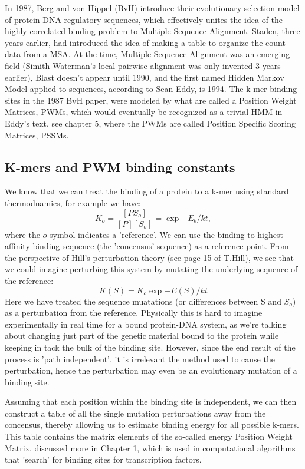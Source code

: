 In 1987, Berg and von-Hippel (BvH) introduce their evolutionary selection model of protein DNA regulatory sequences, which effectively unites the idea of the highly correlated binding problem to Multiple Sequence Alignment.  Staden, three years earlier, had introduced the idea of making a table to organize the count data from a MSA.  At the time, Multiple Sequence Alignment was an emerging field (Simith Waterman's local pairwise alignment was only invented 3 years earlier), Blast doesn't appear until 1990, and the first named Hidden Markov Model applied to sequences, according to Sean Eddy, is 1994.  The k-mer binding sites in the 1987 BvH paper, were modeled by what are called a Position Weight Matrices, PWMs, which would eventually be recognized as a trivial HMM in Eddy's text, see chapter 5, where the PWMs are called Position Specific Scoring Matrices, PSSMs.



\subsection{K-mers and PWM binding constants}
We know that we can treat the binding of a protein to a k-mer using standard thermodnamics, for example we have:
\begin{equation}\label{}
  K_o = \frac{[PS_o]}{[P][S_o]} = \exp{-E_b/kt},
\end{equation}
where the $o$ symbol indicates a 'reference'.  We can use the binding to highest affinity binding sequence (the 'concensus' sequence) as a reference point.  From the perspective of Hill's perturbation theory (see page 15 of T.Hill\cite{hill}), we see that we could imagine perturbing this system by mutating the underlying sequence of the reference:
\begin{equation}\label{}
  K(S) =K_o\exp{-E(S)/kt}
\end{equation}
Here we have treated the sequence muatations (or differences between S and $S_o$) as a perturbation from the reference.  Physically this is hard to imagine experimentally in real time for a bound protein-DNA system, as we're talking about changing just part of the genetic material bound to the protein while keeping in tack the bulk of the binding site.  However, since the end result of the process is 'path independent', it is irrelevant the method used to cause the perturbation, hence the perturbation may even be an evolutionary mutation of a binding site.

Assuming that each position within the binding site is independent, we can then construct a table of all the single mutation perturbations away from the concensus, thereby allowing us to estimate binding energy for all possible k-mers.  This table contains the matrix elements of the so-called energy Position Weight Matrix, discussed more in Chapter 1, which is used in computational algorithms that 'search' for binding sites for transcription factors.
